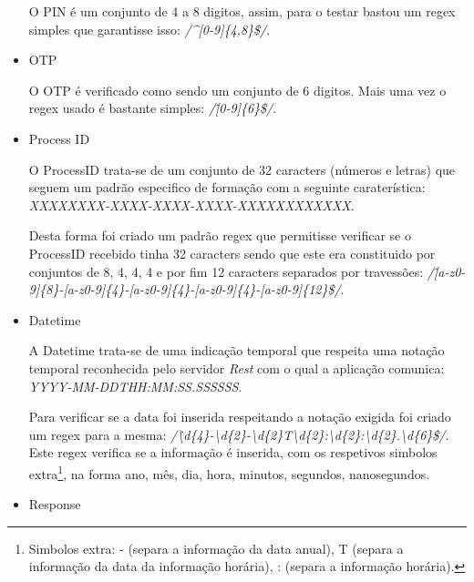 \begin{itemize}
\par O PIN é um conjunto de 4 a 8 digitos, assim, para o testar bastou um regex simples que garantisse isso: \textit{/\^{}[0-9]\{4,8\}\$/}.

\hfill\newline
\item OTP\newline
\par O OTP é verificado como sendo um conjunto de 6 digitos. Mais uma vez o regex usado é bastante simples: \textit{/\^[0-9]\{6\}\$/}.


\hfill\newline
\item Process ID\newline

\par O ProcessID trata-se de um conjunto de 32 caracters (números e letras) que seguem um padrão especifico de formação com a seguinte caraterística: \textit{XXXXXXXX-XXXX-XXXX-XXXX-XXXXXXXXXXXX}.\newline
\par Desta forma foi criado um padrão regex que permitisse verificar se o ProcessID recebido tinha 32 caracters sendo que este era constituido por conjuntos de 8, 4, 4, 4 e por fim 12 caracters separados por travessões: \textit{/\^[a-z0-9]\{8\}-[a-z0-9]\{4\}-[a-z0-9]\{4\}-[a-z0-9]\{4\}-[a-z0-9]\{12\}\$/}.

\hfill\newline
\item Datetime\newline

\par A Datetime trata-se de uma indicação temporal que respeita uma notação temporal reconhecida pelo servidor \textit{Rest} com o qual a aplicação comunica: \textit{YYYY-MM-DDTHH:MM:SS.SSSSSS}.
\par Para verificar se a data foi inserida respeitando a notação exigida foi criado um regex para a mesma: \textit{/\^\textbackslash d\{4\}-\textbackslash d\{2\}-\textbackslash d\{2\}T\textbackslash d\{2\}:\textbackslash d\{2\}:\textbackslash d\{2\}.\textbackslash d\{6\}\$/}. Este regex verifica se a informação é inserida, com os respetivos simbolos extra\footnote{Simbolos extra: - (separa a informação da data anual), T (separa a informação da data da informação horária), : (separa a informação horária).}, na forma ano, mês, dia, hora, minutos, segundos, nanosegundos.

\hfill\newline
\item Response\newline


\end{itemize}
